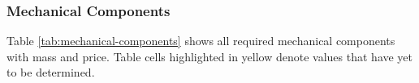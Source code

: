 \documentclass[a4paper,12pt,twoside]{article}
\providecommand{\DIFaddbegin}{} %
\providecommand{\DIFaddend}{} %
\newcommand{\DIFaddincludegraphics}[2][]{{\color{blue}\fbox{\DIFOincludegraphics[#1]{#2}}}} %
\DeclareRobustCommand{\DIFaddbegin}{\DIFOaddbegin \let\includegraphics\DIFaddincludegraphics} %
\DeclareRobustCommand{\DIFaddend}{\DIFOaddend \let\includegraphics\DIFOincludegraphics} %
\begin{document}
\begin{landscape}

\subsubsection{Mechanical Components}

Table \ref{tab:mechanical-components} shows all required mechanical components with mass and price. Table cells highlighted in yellow denote values that have yet to be determined.

\DIFaddbegin \begin{longtable}{|m{}|m{}|m{}|m{}|m{}|m{}|m{}|m{}|}
     \DIFaddend 


\end{longtable}
\end{landscape}
\end{document}
